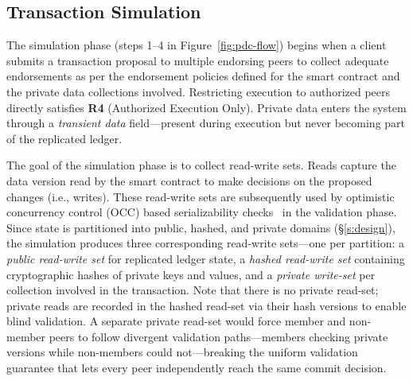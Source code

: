 \subsection{Transaction Simulation}
The simulation phase (steps 1--4 in Figure~\ref{fig:pdc-flow}) begins when a client submits a transaction proposal to multiple endorsing peers to collect adequate endorsements as per the endorsement policies defined for the smart contract and the private data collections involved. Restricting execution to authorized peers directly satisfies \textbf{R4} (Authorized Execution Only). Private data enters the system through a \textit{transient data} field---present during execution but never becoming part of the replicated ledger.

The goal of the simulation phase is to collect read-write sets. Reads capture the data version read by the smart contract to make decisions on the proposed changes (i.e., writes). These read-write sets are subsequently used by optimistic concurrency control (OCC) based serializability checks~\cite{occ} in the validation phase. Since state is partitioned into public, hashed, and private domains (\S\ref{s:design}), the simulation produces three corresponding read-write sets---one per partition: a \textit{public read-write set} for replicated ledger state, a \textit{hashed read-write set} containing cryptographic hashes of private keys and values, and a \textit{private write-set} per collection involved in the transaction. Note that there is no private read-set; private reads are recorded in the hashed read-set via their hash versions to enable blind validation. A separate private read-set would force member and non-member peers to follow divergent validation paths---members checking private versions while non-members could not---breaking the uniform validation guarantee that lets every peer independently reach the same commit decision.

